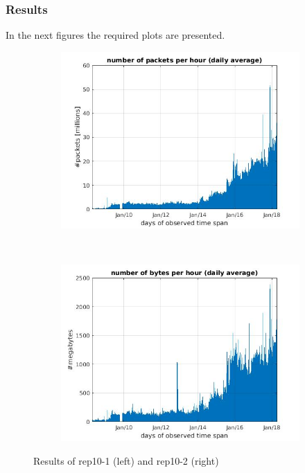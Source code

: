 \subsubsection*{Results}
In the next figures the required plots are presented.

\begin{figure}[H]
\center
	\begin{subfigure}[b]{0.49\textwidth}
	\includegraphics[width=\textwidth]{./chapters/plots/rep10_1.jpg}\\
	\end{subfigure}
	~
	\begin{subfigure}[b]{0.49\textwidth}
	\includegraphics[width=\textwidth]{./chapters/plots/rep10_2.jpg}\\
	\end{subfigure}
	\caption{Results of rep10-1 (left) and rep10-2 (right)}
\end{figure}

